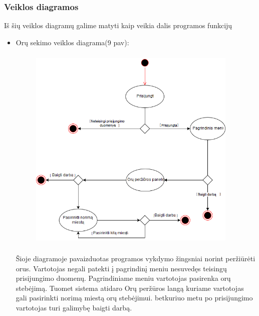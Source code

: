\documentclass[oneside]{VUMIFPSkursinis}
\begin{document}
\subsubsection{Veiklos diagramos}
Iš šių veiklos diagramų galime matyti kaip veikia dalis programos funkcijų
\begin{itemize}
\item Orų sekimo veiklos diagrama(9 pav):
	\begin{figure}[H]
	\centering	
	\includegraphics[width=10cm,height=10cm,keepaspectratio]{veiklos_diagrama_orai.png}
	\caption{}
	\label{}
	\end{figure}

Šioje diagramoje pavaizduotas programos vykdymo žingsniai norint peržiūrėti orus. Vartotojas negali patekti į pagrindinį meniu nesuvedęs teisingų prisijungimo duomenų. Pagrindiniame meniu vartotojas pasirenka orų stebėjimą. Tuomet sistema atidaro Orų peržūros langą kuriame vartotojas gali pasirinkti norimą miestą orų stebėjimui. betkuriuo metu po prisijungimo vartotojas turi galimybę baigti darbą.


\end{itemize}
\end{document}
